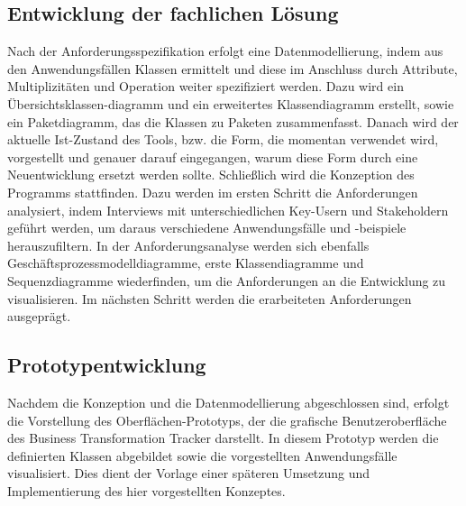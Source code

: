 \subsection{Entwicklung der fachlichen Lösung}
Nach der Anforderungsspezifikation erfolgt eine Datenmodellierung, indem aus den Anwendungsfällen Klassen ermittelt und diese im Anschluss durch Attribute, Multiplizitäten und Operation weiter spezifiziert werden. Dazu wird ein Übersichtsklassen-diagramm und ein erweitertes Klassendiagramm erstellt, sowie ein Paketdiagramm, das die Klassen zu Paketen zusammenfasst.  Danach wird der aktuelle Ist-Zustand des Tools, bzw. die Form, die momentan verwendet wird, vorgestellt und genauer darauf eingegangen, warum diese Form durch eine Neuentwicklung ersetzt werden sollte. Schließlich wird die Konzeption des Programms stattfinden. Dazu werden im ersten Schritt die Anforderungen analysiert, indem Interviews mit unterschiedlichen Key-Usern und Stakeholdern geführt werden, um daraus verschiedene Anwendungsfälle und -beispiele herauszufiltern. In der Anforderungsanalyse werden sich ebenfalls Geschäftsprozessmodelldiagramme, erste Klassendiagramme und Sequenzdiagramme wiederfinden, um die Anforderungen an die Entwicklung zu visualisieren. Im nächsten Schritt werden die erarbeiteten Anforderungen ausgeprägt.

\subsection{Prototypentwicklung}
Nachdem die Konzeption und die Datenmodellierung abgeschlossen sind, erfolgt die Vorstellung des Oberflächen-Prototyps, der die grafische Benutzeroberfläche des Business Transformation Tracker darstellt. In diesem Prototyp werden die definierten Klassen abgebildet sowie die vorgestellten Anwendungsfälle visualisiert. Dies dient der Vorlage einer späteren Umsetzung und Implementierung des hier vorgestellten Konzeptes. 